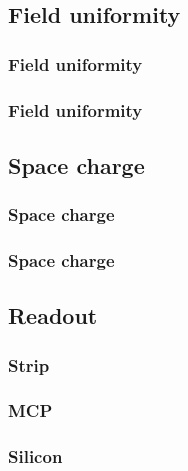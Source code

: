 \subsection{Field uniformity}
\begin{frame}
  \frametitle{Field uniformity}

\end{frame}

\begin{frame}
  \frametitle{Field uniformity}

\end{frame}

\subsection{Space charge}
\begin{frame}
  \frametitle{Space charge}

\end{frame}

\begin{frame}
  \frametitle{Space charge}

\end{frame}

\subsection{Readout}
\begin{frame}
  \frametitle{Strip}

\end{frame}

\begin{frame}
  \frametitle{MCP}

\end{frame}

\begin{frame}
  \frametitle{Silicon}

\end{frame}